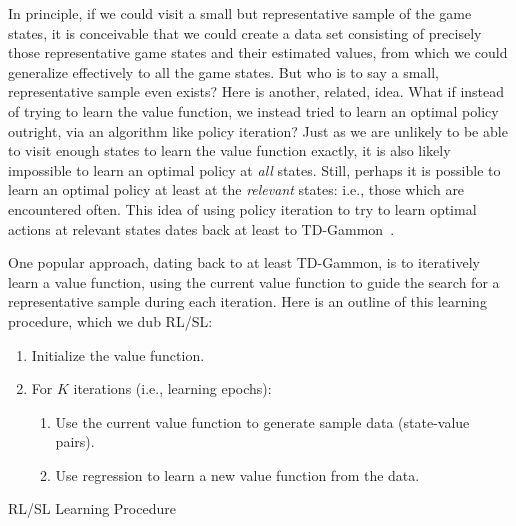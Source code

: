 \documentclass{article}
\begin{document}
In principle, if we could visit a small but representative sample of
the game states, it is conceivable that we could create a data set
consisting of precisely those representative game states and their
estimated values, from which we could generalize effectively to all
the game states.  But who is to say a small, representative sample
even exists?  Here is another, related, idea.  What if instead of
trying to learn the value function, we instead tried to learn an
optimal policy outright, via an algorithm like policy iteration?
Just as we are unlikely to be able to visit enough states to learn the
value function exactly, it is also likely impossible to learn an
optimal policy at \emph{all\/} states.  Still, perhaps it is possible
to learn an optimal policy at least at the \emph{relevant\/} states:
i.e., those which are encountered often.  This idea of using policy
iteration to try to learn optimal actions at relevant states dates
back at least to TD-Gammon~\cite{tdgammon}.  

One popular approach, dating back to at least TD-Gammon, is to
iteratively learn a value function, using the current value function
to guide the search for a representative sample during each iteration.
%
Here is an outline of this learning procedure, which we dub RL/SL:

\begin{table}[h!]
\begin{enumerate}
\item Initialize the value function.
  
\item For $K$ iterations (i.e., learning epochs):

\begin{enumerate}
\item Use the current value function to generate sample data (state-value pairs).
  
\item Use regression to learn a new value function from the data.
\end{enumerate}

\end{enumerate}
\caption{RL/SL Learning Procedure}
\label{alg:rl-sl}
\end{table}
\fi
\end{document}
